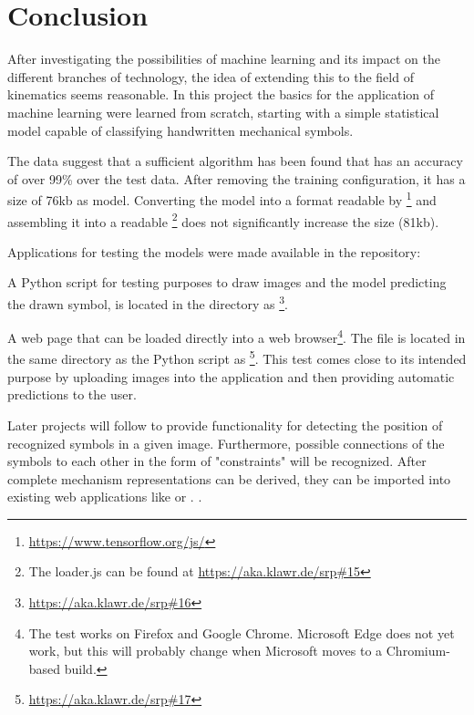 \section{Conclusion}

After investigating the possibilities of machine learning and its impact on the different branches of technology, the idea of extending this to the field of kinematics seems reasonable.
In this project the basics for the application of machine learning were learned from scratch, starting with a simple statistical model capable of classifying handwritten mechanical symbols.

The data suggest that a sufficient algorithm has been found that has an accuracy of over 99\% over the test data.
After removing the training configuration, it has a size of 76kb as  model.
Converting the model into a format readable by \footnote{\url{https://www.tensorflow.org/js/}} and assembling it into a readable \footnote{The loader.js can be found at \url{https://aka.klawr.de/srp\#15}} does not significantly increase the size (81kb).

Applications for testing the models were made available in the repository:

A Python script for testing purposes to draw images and the model predicting the drawn symbol, is located in the  directory as \footnote{\url{https://aka.klawr.de/srp\#16}}.

A web page that can be loaded directly into a web browser\footnote{The test works on Firefox and Google Chrome. Microsoft Edge does not yet work, but this will probably change when Microsoft moves to a Chromium-based build. }.
The file is located in the same directory as the Python script as \footnote{\url{https://aka.klawr.de/srp\#17}}.
This test comes close to its intended purpose by uploading images into the application and then providing automatic predictions to the user.

Later projects will follow to provide functionality for detecting the position of recognized symbols in a given image.
Furthermore, possible connections of the symbols to each other in the form of "constraints" will be recognized.
After complete mechanism representations can be derived, they can be imported into existing web applications like  \cite{Goessner2019, Goessner2019a, Goessner2019b} or . \cite{Uhlig2019, Uhlig2019a}.